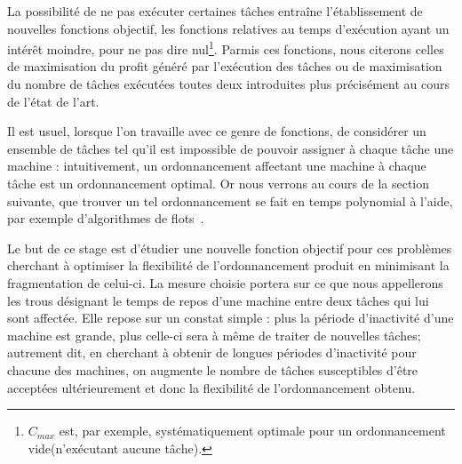 \documentclass[a4paper,11pt]{report}
\begin{document}
La possibilité de ne pas exécuter certaines tâches entraîne l'établissement de nouvelles fonctions
objectif, les fonctions relatives au temps d'exécution ayant un intérêt moindre, pour ne pas dire
nul\footnote{$C_{max}$ est, par exemple, systématiquement optimale pour un ordonnancement
vide(n'exécutant aucune tâche).}. Parmis ces fonctions, nous citerons celles de maximisation du
profit généré par l'exécution des tâches ou de maximisation du nombre de tâches exécutées toutes
deux introduites plus précisément au cours de l'état de l'art. 

Il est
usuel, lorsque l'on travaille avec ce genre de fonctions, de considérer un ensemble de tâches tel
qu'il est impossible de pouvoir assigner à chaque tâche une machine : intuitivement, un
ordonnancement affectant une machine à chaque tâche est un ordonnancement optimal. Or nous verrons
au cours de la section suivante, que trouver un tel ordonnancement se fait en temps polynomial à
l'aide, par exemple d'algorithmes de flots~\cite{arkin_scheduling_1987}.



Le but de ce stage est d'étudier une nouvelle fonction objectif pour ces problèmes cherchant à
optimiser la flexibilité de l'ordonnancement produit en minimisant la fragmentation de celui-ci. La
mesure choisie portera sur ce que nous appellerons les trous désignant le temps de repos d'une
machine entre deux tâches qui lui sont affectée. Elle repose sur un constat simple : plus la période
d'inactivité d'une machine est grande, plus celle-ci sera à même de traiter de nouvelles tâches;
autrement dit, en cherchant à obtenir de longues périodes d'inactivité pour chacune des machines, on
augmente le nombre de tâches susceptibles d'être acceptées ultérieurement et donc la flexibilité de
l'ordonnancement obtenu.
\end{document}
